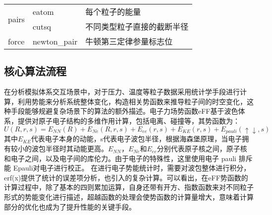 \begin{table}[]
\begin{tabular}{@{}l|l|l@{}}
\multirow{2}{*}{pairs} & eatom        & 每个粒子的能量                                                                                      \\ \cmidrule(l){2-3} 
                       & cutsq        & 不同类型粒子直接的截断半径                                                                                \\ \midrule
force                  & newton\_pair & 牛顿第三定律参量标志位                                                                                  \\ \bottomrule
\end{tabular}
\end{table}

\subsection{核心算法流程}
在分析模拟体系交互场景中，对于压力、温度等粒子数据采用统计学手段进行计算，利用势能来分析系统整体变化，构造相关势函数来推导粒子间的时空变化，这种手段能够规避复杂场景下的算法的额外描述。电子力场势函数eFF基于波色体系，提供对原子电子结构的多维作用计算，包括电离、碰撞等，其势函数为：
\begin{equation}
U(R,r,s) = E_{NN}(R) + E_{Ne}(R,r,s) + E_{ee}(r,s) + E_{KE}(r,s) +E_{pauli}(\uparrow\downarrow,s)
\end{equation}
其中$E_{KE}$代表电子本身的动能，s代表电子波包半径，根据海森堡原理，当电子拥有较小的波包半径时其动能更高。$E_{NN}$，$E_{Ne}$和$E_{ee}$分别代表原子核之间，原子核和电子之间，以及电子间的库伦力。由于电子的特殊性，这里使用电子 pauli 排斥能 Epauli对电子进行校正。
在进行电子势能统计时，需要对波包整体进行积分，erf(x)提供了统计的误差项分析，也引入的复杂计算。可以看出，在eFF势函数的计算过程中，除了基本的四则累加运算，自身还带有开方、指数函数来对不同粒子形式的势能变化进行描述，超越函数的处理会使势函数的计算量增大，意味着计算部分的优化也成为了提升性能的关键手段。

